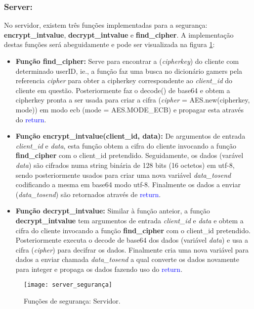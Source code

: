 \subsubsection{Server:}
No servidor, existem três funções implementadas para a segurança: \textbf{encrypt\_intvalue}, \textbf{decrypt\_intvalue} e \textbf{find\_cipher}. A implementação destas funções será abeguidamente e pode ser visualizada na figura \ref{fig:server_segurança}:
	\begin{itemize}
		\item\textbf{Função \textbf{find\_cipher}:} Serve para encontrar a (\textit{cipherkey}) do cliente com determinado userID, ie., a função faz uma busca no dicionário gamers pela referencia \textit{cipher} para obter a cipherkey correspondente ao \textit{client\_id} do cliente em questão. Posteriormente faz o decode() de base64 e obtem a cipherkey pronta a ser usada para criar a cifra (\textit{cipher} = AES.new(cipherkey, mode)) em modo \ac{ecb} (mode = AES.MODE\_ECB) e propagar esta através do \textcolor{blue}{return}.
		
		\item\textbf{Função \textbf{encrypt\_intvalue(client\_id, data)}:} De argumentos de entrada \textit{client\_id} e \textit{data}, esta função obtem a cifra do cliente invocando a função \textbf{find\_cipher} com o client\_id pretendido. Seguidamente, os dados (varável \textit{data}) são cifrados numa string binária de 128 bits (16 octetos) em \ac{utf-8}, sendo posteriormente usados para criar uma nova variável \textit{data\_tosend} codificando a mesma em base64 modo \ac{utf-8}. Finalmente os dados a enviar (\textit{data\_tosend}) são retornados  através de \textcolor{blue}{return}.
		\item\textbf{Função \textbf{decrypt\_intvalue}:} Similar à função anteior, a função \textbf{decrypt\_intvalue} tem argumentos de entrada \textit{client\_id} e \textit{data} e obtem a cifra do cliente invocando a função \textbf{find\_cipher} com o client\_id pretendido. Posteriormente executa o decode de base64 dos dados (variável \textit{data}) e usa a cifra (\textit{cipher}) para decifrar os dados. Finalmente cria uma nova variável para dados a enviar chamada \textit{data\_tosend} a qual converte os dados novamente para integer e propaga os dados fazendo uso do \textcolor{blue}{return}.		
	\end{itemize} 
	
\begin{figure}[H]
	\centering
	\texttt{[image: server\_segurança]}
	\caption{Funções de segurança: Servidor.\\}
	\label{fig:server_segurança}
\end{figure} 

